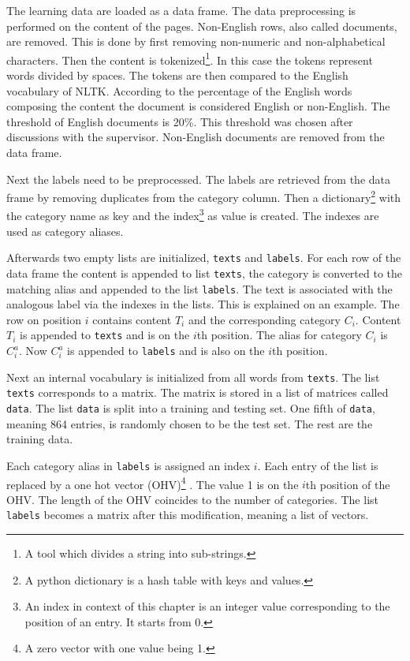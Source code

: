 The learning data are loaded as a data frame. The data preprocessing is performed on the content of the pages. Non-English rows, also called documents, are removed. This is done by first removing non-numeric and non-alphabetical characters. Then the content is tokenized\footnote{A tool which divides a string into sub-strings.}. In this case the tokens represent words divided by spaces. The tokens are then compared to the English vocabulary of NLTK. According to the percentage of the English words composing the content the document is considered English or non-English. The threshold of English documents is 20\%. This threshold was chosen after discussions with the supervisor. Non-English documents are removed from the data frame.

Next the labels need to be preprocessed. The labels are retrieved from the data frame by removing duplicates from the category column. Then a dictionary\footnote{A python dictionary is a hash table with keys and values.} with the category name as key and the index\footnote{An index in context of this chapter is an integer value corresponding to the position of an entry. It starts from 0.} as value is created. The indexes are used as category aliases. 

Afterwards two empty lists are initialized, \texttt{texts} and \texttt{labels}. For each row of the data frame the content is appended to list \texttt{texts}, the category is converted to the matching alias and appended to the list \texttt{labels}. The text is associated with the analogous label via the indexes in the lists.  This is explained on an example. The row on position $i$ contains content $T_i$ and the corresponding category $C_i$. Content $T_i$ is appended to \texttt{texts} and is on the $i$th position. The alias for category $C_i$ is $C^a_i$. Now $C^a_i$ is appended to \texttt{labels} and is also on the $i$th position.

Next an internal vocabulary is initialized from all words from \texttt{texts}. The list \texttt{texts} corresponds to a matrix. The matrix is stored in a list of matrices called \texttt{data}. The list \texttt{data} is split into a training and testing set. One fifth of \texttt{data}, meaning 864 entries, is randomly chosen to be the test set. The rest are the training data.

Each category alias in \texttt{labels} is assigned an index $i$. Each entry of the list is replaced by a one hot vector (OHV)\footnote{A zero vector with one value being 1.} . The value 1 is on the $i$th position of the OHV. The length of the OHV coincides to the number of categories. The list \texttt{labels} becomes a matrix after this modification, meaning a list of vectors.

